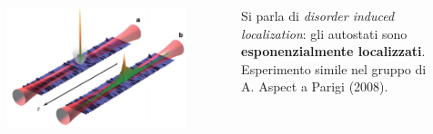\documentclass[10pt, t]{beamer}
\begin{document}
\begin{frame}[t]
\begin{columns}
\begin{figure}
\includegraphics[scale=0.15]{immaginiPresentazione/Incipit.png}
\end{figure}


\begin{center}
Si parla di \emph{disorder induced localization}: gli autostati sono \textbf{esponenzialmente localizzati}. Esperimento simile nel gruppo di A. Aspect a Parigi (2008).
\end{center}
\end{columns}
\end{frame}
\end{document}

